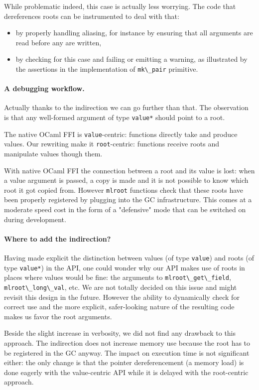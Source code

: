 \documentclass[a4paper]{easychair}
\newcommand{\cpp}[1]{\lstinline[style=C++]{#1}}
\begin{document}
While problematic indeed, this case is actually less worrying. The code
that dereferences roots can be instrumented to deal with that:
%
\begin{itemize}
\item by properly handling aliasing, for instance by ensuring that all
      arguments are read before any are written,
\item by checking for this case and failing or emitting a warning, as
      illustrated by the assertions in the implementation of
      \cpp{mk\_pair} primitive. 
\end{itemize}

\paragraph{A debugging workflow.} Actually thanks to the indirection we can go
further than that. The observation is that any well-formed argument of type
\cpp{value*} should point to a root. 

The native OCaml FFI is \texttt{value}-centric: functions directly take and produce
values. Our rewriting make it \texttt{root}-centric: functions receive roots
and manipulate values though them.

With native OCaml FFI the connection between a root and its value is lost: when
a value argument is passed, a copy is made and it is not possible to know which
root it got copied from.  However \cpp{mlroot} functions check that these roots
have been properly registered by plugging into the GC infrastructure. This
comes at a moderate speed cost in the form of a "defensive" mode that can be
switched on during development.

\paragraph{Where to add the indirection?}

Having made explicit the distinction between values (of type
\cpp{value}) and roots (of type \cpp{value*}) in the API, one
could wonder why our API makes use of roots in places where values would
be fine: the arguments to \cpp{mlroot\_get\_field}, \cpp{mlroot\_long\_val},
etc.  We are not totally decided on this issue and might revisit this design
in the future. However the ability to dynamically check for correct use
and the more explicit, safer-looking nature of the resulting code makes
us favor the root arguments.

Beside the slight increase in verbosity, we did not find any drawback to
this approach.  The indirection does not increase memory use because the root
has to be registered in the GC anyway. The impact on execution time is not significant either: the only change is that the pointer dereferencement (a memory load) is done eagerly with the value-centric API while it is delayed with the root-centric approach.
\end{document}
